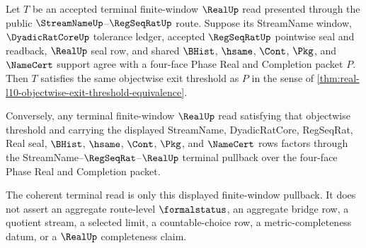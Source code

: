 \begin{theorem}
\label{thm:real-l10-terminal-pullback-coherence}
Let $T$ be an accepted terminal finite-window $\RealUp$ read presented through
the public $\StreamNameUp$--$\RegSeqRatUp$ route. Suppose its StreamName
window, $\DyadicRatCoreUp$ tolerance ledger, accepted $\RegSeqRatUp$ pointwise
seal and readback, $\RealUp$ seal row, and shared $\BHist$, $\hsame$, $\Cont$,
$\Pkg$, and $\NameCert$ support agree with a four-face Phase Real and
Completion packet $P$. Then $T$ satisfies the same objectwise exit threshold as
$P$ in the sense of
\autoref{thm:real-l10-objectwise-exit-threshold-equivalence}.

Conversely, any terminal finite-window $\RealUp$ read satisfying that
objectwise threshold and carrying the displayed StreamName, DyadicRatCore,
RegSeqRat, Real seal, $\BHist$, $\hsame$, $\Cont$, $\Pkg$, and $\NameCert$ rows
factors through the StreamName--$\RegSeqRat$--$\RealUp$ terminal pullback over
the four-face Phase Real and Completion packet.

The coherent terminal read is only this displayed finite-window pullback. It
does not assert an aggregate route-level $\formalstatus$, an aggregate bridge
row, a quotient stream, a selected limit, a countable-choice row, a
metric-completeness datum, or a $\RealUp$ completeness claim.
\end{theorem}
